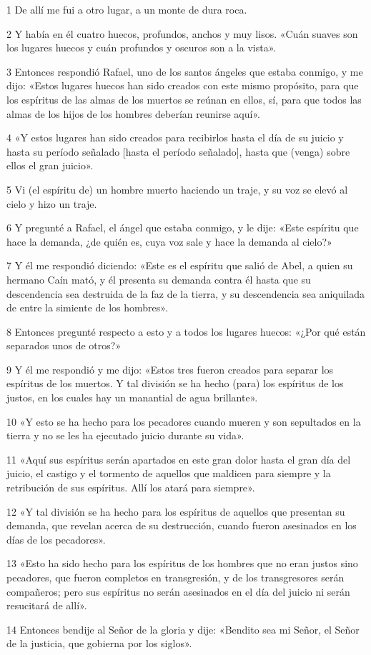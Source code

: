 \par 1 De allí me fui a otro lugar, a un monte de dura roca.
\par 2 Y había en él cuatro huecos, profundos, anchos y muy lisos. «Cuán suaves son los lugares huecos y cuán profundos y oscuros son a la vista».
\par 3 Entonces respondió Rafael, uno de los santos ángeles que estaba conmigo, y me dijo: «Estos lugares huecos han sido creados con este mismo propósito, para que los espíritus de las almas de los muertos se reúnan en ellos, sí, para que todos las almas de los hijos de los hombres deberían reunirse aquí».
\par 4 «Y estos lugares han sido creados para recibirlos hasta el día de su juicio y hasta su período señalado [hasta el período señalado], hasta que (venga) sobre ellos el gran juicio».
\par 5 Vi (el espíritu de) un hombre muerto haciendo un traje, y su voz se elevó al cielo y hizo un traje.
\par 6 Y pregunté a Rafael, el ángel que estaba conmigo, y le dije: «Este espíritu que hace la demanda, ¿de quién es, cuya voz sale y hace la demanda al cielo?»
\par 7 Y él me respondió diciendo: «Este es el espíritu que salió de Abel, a quien su hermano Caín mató, y él presenta su demanda contra él hasta que su descendencia sea destruida de la faz de la tierra, y su descendencia sea aniquilada de entre la simiente de los hombres».
\par 8 Entonces pregunté respecto a esto y a todos los lugares huecos: «¿Por qué están separados unos de otros?»
\par 9 Y él me respondió y me dijo: «Estos tres fueron creados para separar los espíritus de los muertos. Y tal división se ha hecho (para) los espíritus de los justos, en los cuales hay un manantial de agua brillante».
\par 10 «Y esto se ha hecho para los pecadores cuando mueren y son sepultados en la tierra y no se les ha ejecutado juicio durante su vida».
\par 11 «Aquí sus espíritus serán apartados en este gran dolor hasta el gran día del juicio, el castigo y el tormento de aquellos que maldicen para siempre y la retribución de sus espíritus. Allí los atará para siempre».
\par 12 «Y tal división se ha hecho para los espíritus de aquellos que presentan su demanda, que revelan acerca de su destrucción, cuando fueron asesinados en los días de los pecadores».
\par 13 «Esto ha sido hecho para los espíritus de los hombres que no eran justos sino pecadores, que fueron completos en transgresión, y de los transgresores serán compañeros; pero sus espíritus no serán asesinados en el día del juicio ni serán resucitará de allí».
\par 14 Entonces bendije al Señor de la gloria y dije: «Bendito sea mi Señor, el Señor de la justicia, que gobierna por los siglos».

